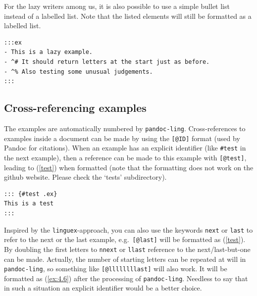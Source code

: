 \documentclass[
]{article}
\begin{document}
For the lazy writers among us, it is also possible to use a simple
bullet list instead of a labelled list. Note that the listed elements
will still be formatted as a labelled list.

\begin{verbatim}
:::ex
- This is a lazy example.
- ^# It should return letters at the start just as before.
- ^% Also testing some unusual judgements.
:::
\end{verbatim}

\begin{samepage}
\begin{exe} \judgewidth{\#}
  \ex 
  \begin{xlist}
  \end{xlist}
  \label{ex:4.12}
\end{exe}
\end{samepage}

\hypertarget{cross-referencing-examples}{%
\subsection{Cross-referencing
examples}\label{cross-referencing-examples}}

The examples are automatically numbered by \texttt{pandoc-ling}.
Cross-references to examples inside a document can be made by using the
\texttt{{[}@ID{]}} format (used by Pandoc for citations). When an
example has an explicit identifier (like \texttt{\#test} in the next
example), then a reference can be made to this example with
\texttt{{[}@test{]}}, leading to (\ref{test}) when formatted (note that
the formatting does not work on the github website. Please check the
`tests' subdirectory).

\begin{verbatim}
::: {#test .ex}
This is a test
:::
\end{verbatim}

\begin{samepage}
\begin{exe} \judgewidth{}
  \label{test}
\end{exe}
\end{samepage}

Inspired by the \texttt{linguex}-approach, you can also use the keywords
\texttt{next} or \texttt{last} to refer to the next or the last example,
e.g.~\texttt{{[}@last{]}} will be formatted as (\ref{test}). By doubling
the first letters to \texttt{nnext} or \texttt{llast} reference to the
next/last-but-one can be made. Actually, the number of starting letters
can be repeated at will in \texttt{pandoc-ling}, so something like
\texttt{{[}@llllllllast{]}} will also work. It will be formatted as
(\ref{ex:4.6}) after the processing of \texttt{pandoc-ling}. Needless to
say that in such a situation an explicit identifier would be a better
choice.
\end{document}
